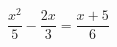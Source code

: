 \begin{ex}
	\begin{condition}
		\( \dfrac{x^2}{5}-\dfrac{2x}{3}=\dfrac{x+5}{6} \)
	\end{condition}
\end{ex}